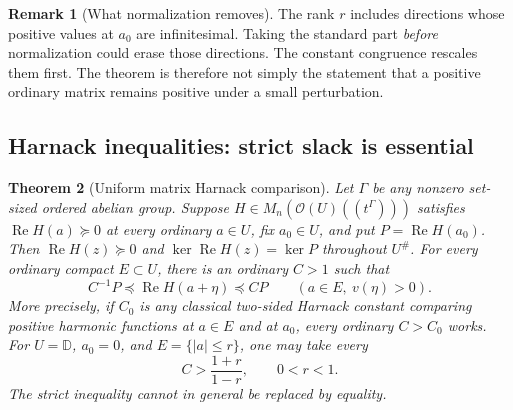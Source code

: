 \documentclass[11pt,letterpaper]{article}
\newtheorem{theorem}{Theorem}[section]
\theoremstyle{definition}
\newtheorem{remark}[theorem]{Remark}
\newcommand{\D}{\mathbb D}\newcommand{\No}{\mathbf{No}}
\newcommand{\OU}[1]{\mathcal O(#1)((t^\Gamma))}
\newcommand{\Rea}{\operatorname{Re}}
\newcommand{\halo}[1]{#1^{\#}}
\numberwithin{equation}{section}
\begin{document}
\begin{remark}[What normalization removes]
The rank $r$ includes directions whose positive values at $a_0$ are infinitesimal. Taking the standard part \emph{before} normalization could erase those directions. The constant congruence rescales them first. The theorem is therefore not simply the statement that a positive ordinary matrix remains positive under a small perturbation.
\end{remark}

\subsection{Harnack inequalities: strict slack is essential}

\begin{theorem}[Uniform matrix Harnack comparison]\label{herg:thm:harnack}
Let $\Gamma$ be any nonzero set-sized ordered abelian group.
Suppose $H\in M_n(\OU{U})$ satisfies $\Rea H(a)\succeq0$ at every ordinary
$a\in U$, fix $a_0\in U$, and put $P=\Rea H(a_0)$.
Then $\Rea H(z)\succeq0$ and $\ker\Rea H(z)=\ker P$ throughout $\halo U$.
For every ordinary compact $E\subset U$, there is an ordinary $C>1$ such that
\begin{equation}\label{herg:eq:harnack}
 C^{-1}P\preceq\Rea H(a+\eta)\preceq CP
 \qquad(a\in E,\ v(\eta)>0).
\end{equation}
More precisely, if $C_0$ is any classical two-sided Harnack constant comparing positive harmonic functions at $a\in E$ and at $a_0$, every ordinary $C>C_0$ works. For $U=\D$, $a_0=0$, and $E=\{|a|\le r\}$, one may take every
\[
 C>\frac{1+r}{1-r},\qquad 0<r<1.
\]
The strict inequality cannot in general be replaced by equality.
\end{theorem}
\end{document}
